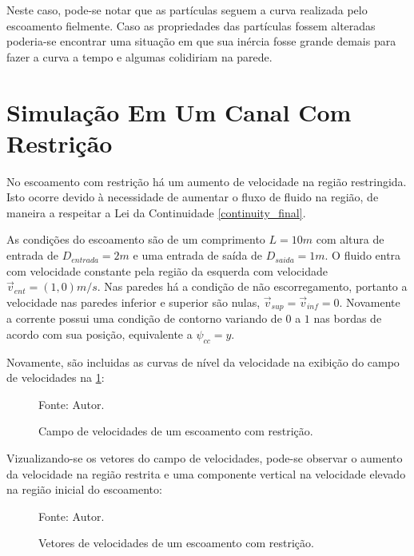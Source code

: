 Neste caso, pode-se notar que as partículas seguem a curva realizada pelo escoamento fielmente.
Caso as propriedades das partículas fossem alteradas poderia-se encontrar uma situação em que sua inércia fosse grande demais para fazer a curva a tempo e algumas colidiriam na parede. 

\section{\textbf{Simulação Em Um Canal Com Restrição}}
\label{sec_nozzle}
No escoamento com restrição há um aumento de velocidade na região restringida.
Isto ocorre devido à necessidade de aumentar o fluxo de fluido na região, de maneira a respeitar a Lei da Continuidade \eqref{continuity_final}.

As condições do escoamento são de um comprimento $L=10m$ com altura de entrada de $D_{entrada}=2m$ e uma entrada de saída de $D_{saida}=1m$.
O fluido entra com velocidade constante pela região da esquerda com velocidade $\vec{v}_{ent}=(1, 0)m/s$.
Nas paredes há a condição de não escorregamento, portanto a velocidade nas paredes inferior e superior são nulas, $\vec{v}_{sup}=\vec{v}_{inf}=0$.
Novamente a corrente possui uma condição de contorno variando de $0$ a $1$ nas bordas de acordo com sua posição, equivalente a $\psi_{cc}=y$.

Novamente, são incluidas as curvas de nível da velocidade na exibição do campo de velocidades na \ref{nozzle_result}:
\begin{figure}[H]
    \centering
     {\raggedleft \scriptsize Fonte: Autor.}
    \caption{Campo de velocidades de um escoamento com restrição.}
    \label{nozzle_result}
\end{figure}

Vizualizando-se os vetores do campo de velocidades, pode-se observar o aumento da velocidade na região restrita e uma componente vertical na velocidade elevado na região inicial do escoamento:
\begin{figure}[H]
    \centering
     {\raggedleft \scriptsize Fonte: Autor.}
    \caption{Vetores de velocidades de um escoamento com restrição.}
    \label{nozzle_velocity}
\end{figure}

